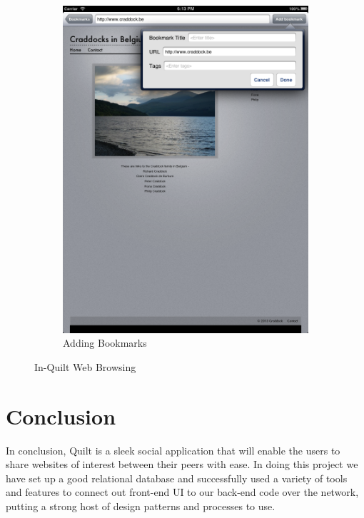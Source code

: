 \documentclass[a4wide, 10pt]{article}
\begin{document}
\begin{figure}
\begin{subfigure}[b]{0.4\textwidth}
                \includegraphics[width=\textwidth]{"screenshots/App Browsing"}
                \caption{Adding Bookmarks}
        \end{subfigure}
        \caption{In-Quilt Web Browsing}\label{fig:browse}
\end{figure}

\section{Conclusion}

In conclusion, Quilt is a sleek social application that will enable the users to share websites of interest between their peers with ease. In doing this project we have set up a good relational database and successfully used a variety of tools and features to connect out front-end UI to our back-end code over the network, putting a strong host of design patterns and processes to use. 
\end{document}
